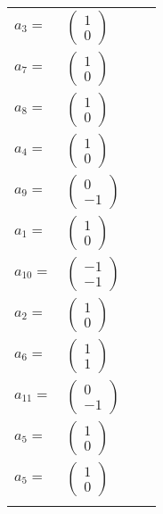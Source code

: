 \documentclass[1p]{elsarticle_modified}
\theoremstyle{definition}
\begin{document}
\begin{tabular}{m{7pt} m{180pt} m{7pt} m{180pt} }
\flushright $a_{3}=$&$\begin{pmatrix}1\\0\end{pmatrix}$ \\
\flushright $a_{7}=$&$\begin{pmatrix}1\\0\end{pmatrix}$ \\
\flushright $a_{8}=$&$\begin{pmatrix}1\\0\end{pmatrix}$ \\
\flushright $a_{4}=$&$\begin{pmatrix}1\\0\end{pmatrix}$ \\
\flushright $a_{9}=$&$\begin{pmatrix}0\\-1\end{pmatrix}$ \\
\flushright $a_{1}=$&$\begin{pmatrix}1\\0\end{pmatrix}$ \\
\flushright $a_{10}=$&$\begin{pmatrix}-1\\-1\end{pmatrix}$ \\
\flushright $a_{2}=$&$\begin{pmatrix}1\\0\end{pmatrix}$ \\
\flushright $a_{6}=$&$\begin{pmatrix}1\\1\end{pmatrix}$ \\
\flushright $a_{11}=$&$\begin{pmatrix}0\\-1\end{pmatrix}$ \\
\flushright $a_{5}=$&$\begin{pmatrix}1\\0\end{pmatrix}$\\ \flushright $a_{5}=$&$\begin{pmatrix}1\\0\end{pmatrix}$\\&\end{tabular}
\end{document}
